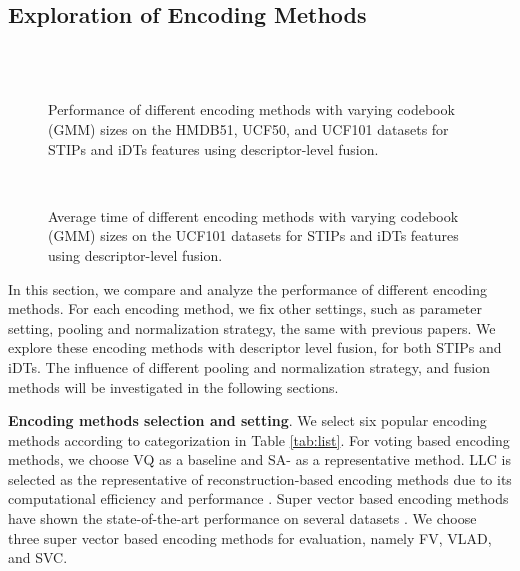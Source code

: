 \documentclass[twocolumn]{svjour3}          \smartqed  \usepackage{slashbox}
\begin{document}
\subsection{Exploration of Encoding Methods}
\label{sec:ex_encoding}
\begin{figure*}
  \centering
  \\
  \\
  \caption{Performance of different encoding methods with varying codebook (GMM) sizes on the HMDB51, UCF50, and UCF101 datasets for STIPs and iDTs features using descriptor-level fusion.}
  \label{fig:encIDT}
\end{figure*}
\begin{figure*}
  \centering
  \\
  \caption{Average time of different encoding methods with varying codebook (GMM) sizes on the UCF101 datasets for STIPs and iDTs features using descriptor-level fusion.}
  \label{fig:time}
\end{figure*}
In this section, we compare and analyze the performance of different encoding methods. For each encoding method, we fix other settings, such as parameter setting, pooling and normalization strategy, the same with previous papers. We explore these encoding methods with descriptor level fusion, for both STIPs and iDTs. The influence of different pooling and normalization strategy, and fusion methods will be investigated in the following sections.

\textbf{Encoding methods selection and setting}. We select six popular encoding methods according to categorization in Table \ref{tab:list}. For voting based encoding methods, we choose VQ as a baseline and SA- as a representative method. LLC is selected as the representative of reconstruction-based encoding methods due to its computational efficiency and performance \cite{WangWQ12}. Super vector based encoding methods have shown the state-of-the-art performance on several datasets \cite{WangS13a} . We choose three super vector based encoding methods for evaluation, namely FV, VLAD, and SVC.
\end{document}
